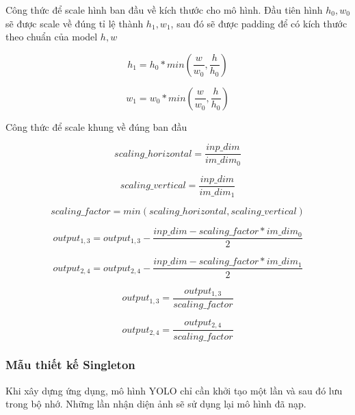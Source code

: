 Công thức để scale hình ban đầu về  kích thước cho mô hình. Đầu tiên hình $h_0, w_0$ sẽ được scale về đúng tỉ lệ thành $h_1, w_1$, sau đó sẽ được padding để có kích thước theo chuẩn của model $h, w$

\begin{equation}
    h_1 = h_0 * min(\frac{w}{w_0}, \frac{h}{h_0})   
\end{equation}

\begin{equation}
    w_1 = w_0 * min(\frac{w}{w_0}, \frac{h}{h_0})   
\end{equation}

Công thức để scale khung về đúng ban đầu 

\begin{equation}
    scaling\_horizontal = \frac{inp\_dim}{im\_dim_0}  
\end{equation}

\begin{equation}
    scaling\_vertical = \frac{inp\_dim}{im\_dim_1}
\end{equation}

\begin{equation}
    scaling\_factor = min(scaling\_horizontal, scaling\_vertical)
\end{equation}


\begin{equation}
    output_{1,3} = output_{1,3} - \frac{inp\_dim - scaling\_factor * im\_dim_0 }{2} 
\end{equation}

\begin{equation}
    output_{2,4} = output_{2,4} - \frac{inp\_dim - scaling\_factor * im\_dim_1 }{2} 
\end{equation}

\begin{equation}
    output_{1,3} = \frac{output_{1,3}}{scaling\_factor}  
\end{equation}

\begin{equation}
    output_{2,4} = \frac{output_{2,4}}{scaling\_factor}  
\end{equation}

\subsubsection{Mẫu thiết kế Singleton}

Khi xây dựng ứng dụng, mô hình YOLO chỉ cần khởi tạo một lần và sau đó lưu trong bộ nhớ. Những lần nhận diện ảnh sẽ sử dụng lại mô hình đã nạp. 

